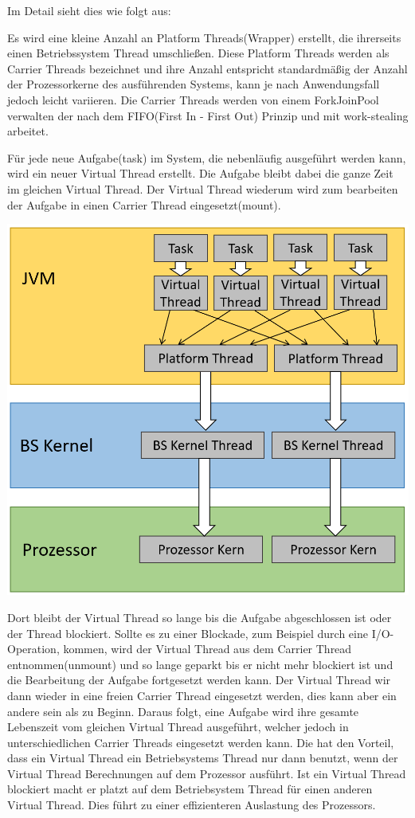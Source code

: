 \documentclass[fontsize=12pt,paper=a4,twoside=semi,parskip=half-,headsepline,headinclude]{scrreprt}
\begin{document}
Im Detail sieht dies wie folgt aus:

Es wird eine kleine Anzahl an Platform Threads(Wrapper) erstellt, die ihrerseits einen Betriebssystem Thread umschließen. Diese Platform Threads werden als Carrier Threads bezeichnet und ihre Anzahl entspricht standardmäßig der Anzahl der Prozessorkerne des ausführenden Systems, kann je nach Anwendungsfall jedoch leicht variieren. Die Carrier Threads werden von einem ForkJoinPool verwalten der nach dem FIFO(First In - First Out) Prinzip und mit work-stealing arbeitet. 

Für jede neue Aufgabe(task) im System, die nebenläufig ausgeführt werden kann, wird ein neuer Virtual Thread erstellt. Die Aufgabe bleibt dabei die ganze Zeit im gleichen Virtual Thread. Der Virtual Thread wiederum wird zum bearbeiten der Aufgabe in einen Carrier Thread eingesetzt(mount). 

\includegraphics[scale=0.5]{figures/VirtualThreads.png}

Dort bleibt der Virtual Thread so lange bis die Aufgabe abgeschlossen ist oder der Thread blockiert. Sollte es zu einer Blockade, zum Beispiel durch eine I/O-Operation, kommen, wird der Virtual Thread aus dem Carrier Thread entnommen(unmount) und so lange geparkt bis er nicht mehr blockiert ist und die Bearbeitung der Aufgabe fortgesetzt werden kann. Der Virtual Thread wir dann wieder in eine freien Carrier Thread eingesetzt werden, dies kann aber ein andere sein als zu Beginn. Daraus folgt, eine Aufgabe wird ihre gesamte Lebenszeit vom gleichen Virtual Thread ausgeführt, welcher jedoch in unterschiedlichen Carrier Threads eingesetzt werden kann. Die hat den Vorteil, dass ein Virtual Thread ein Betriebsystems Thread nur dann benutzt, wenn der Virtual Thread Berechnungen auf dem Prozessor ausführt. Ist ein Virtual Thread blockiert macht er platzt auf dem Betriebsystem Thread für einen anderen Virtual Thread. Dies führt zu einer effizienteren Auslastung des Prozessors.
\end{document}
